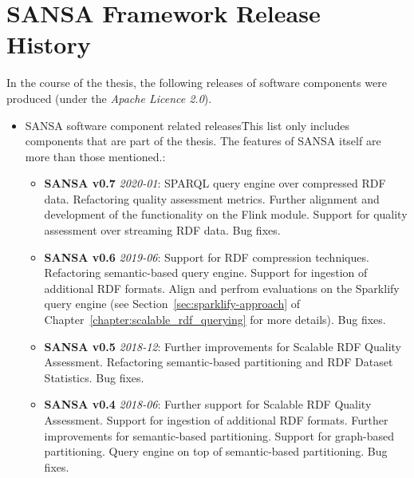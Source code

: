 \chapter{SANSA Framework Release History}
\label{sec:appendix-sansa-releases}

In the course of the thesis, the following releases of software components were produced (under the \textit{Apache Licence 2.0}).

\begin{itemize}
    \item SANSA software component related releases\f{This list only includes components that are part of the thesis. 
    The features of SANSA itself are more than those mentioned.}:
    \begin{itemize}
        
        \item \textbf{SANSA v0.7} \textit{2020-01}:
        \gls{SPARQL} query engine over compressed \gls{RDF} data.
        Refactoring quality assessment metrics.
        Further alignment and development of the functionality on the Flink module.
        Support for quality assessment over streaming \gls{RDF} data.
        Bug fixes.
        
        \item \textbf{SANSA v0.6} \textit{2019-06}:
        Support for \gls{RDF} compression techniques.
        Refactoring semantic-based query engine.
        Support for ingestion of additional \gls{RDF} formats.
        Align and perfrom evaluations on the Sparklify query engine (see Section~\ref{sec:sparklify-approach} of Chapter~\ref{chapter:scalable_rdf_querying} for more details).
        Bug fixes.
        
        \item \textbf{SANSA v0.5} \textit{2018-12}: 
        Further improvements for Scalable \gls{RDF} Quality Assessment. 
        Refactoring semantic-based partitioning and \gls{RDF} Dataset Statistics.
        Bug fixes.
        
        \item \textbf{SANSA v0.4} \textit{2018-06}:
        Further support for Scalable \gls{RDF} Quality Assessment. 
        Support for ingestion of additional \gls{RDF} formats.
        Further improvements for semantic-based partitioning.
        Support for graph-based partitioning.
        Query engine on top of semantic-based partitioning.
        Bug fixes.
        

\end{itemize}
\end{itemize}
